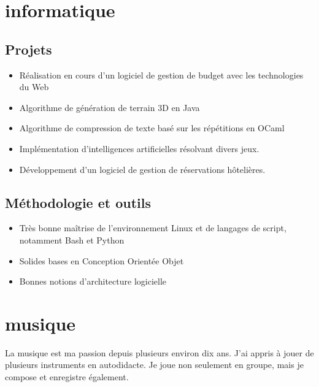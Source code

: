 \section{informatique}
\subsection{Projets}
    \begin{itemize}
        \item Réalisation en cours d'un logiciel de gestion de budget avec les technologies du Web 
        \item Algorithme de génération de terrain 3D en Java 
        \item Algorithme de compression de texte basé sur les répétitions en OCaml
        \item Implémentation d'intelligences artificielles résolvant divers jeux.
        \item Développement d'un logiciel de gestion de réservations hôtelières.
    \end{itemize}
\subsection{Méthodologie et outils}
    \begin{itemize}
        \item Très bonne maîtrise de l'environnement Linux et de langages de script, notamment Bash et Python
        \item Solides bases en Conception Orientée Objet 
        \item Bonnes notions d'architecture logicielle 
    \end{itemize}



\section{musique}
\vspace{-0.2cm}
La musique est ma passion depuis plusieurs environ dix ans.
J'ai appris à jouer de plusieurs instruments en autodidacte. Je joue non seulement en groupe, mais je compose et enregistre également.